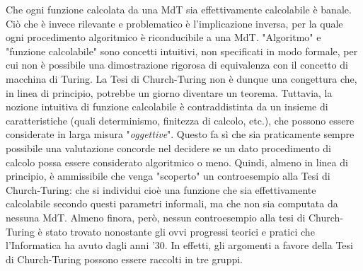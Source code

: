 Che ogni funzione calcolata da una MdT sia effettivamente calcolabile è banale. Ciò
che è invece rilevante e problematico è l'implicazione inversa, per la quale ogni
procedimento algoritmico è riconducibile a una MdT. "Algoritmo" e "funzione
calcolabile" sono concetti intuitivi, non specificati in modo formale, per cui non è
possibile una dimostrazione rigorosa di equivalenza con il concetto di macchina di
Turing. La Tesi di Church-Turing non è dunque una congettura che, in linea di
principio, potrebbe un giorno diventare un teorema. Tuttavia, la nozione intuitiva di
funzione calcolabile è contraddistinta da un insieme di caratteristiche (quali
determinismo, finitezza di calcolo, etc.), che possono essere considerate in larga
misura "\textit{oggettive}". Questo fa sì che sia praticamente sempre possibile una
valutazione concorde nel decidere se un dato procedimento di calcolo possa essere
considerato algoritmico o meno. Quindi, almeno in linea di principio, è ammissibile
che venga "scoperto" un controesempio alla Tesi di Church-Turing: che si individui
cioè una funzione che sia effettivamente calcolabile secondo questi parametri
informali, ma che non sia computata da nessuna MdT. Almeno finora, però, nessun
controesempio alla tesi di Church-Turing è stato trovato nonostante gli ovvi
progressi teorici e pratici che l'Informatica ha avuto dagli anni '30. In effetti,
gli argomenti a favore della Tesi di Church-Turing possono essere raccolti in tre
gruppi.

